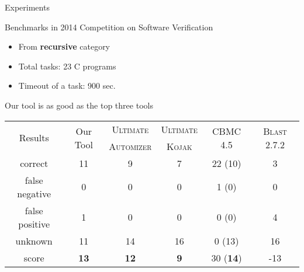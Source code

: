 \begin{frame}{Experiments}

  Benchmarks in 2014 Competition on Software Verification
  \begin{itemize}
    \item From \textbf{recursive} category
    \item Total tasks: 23 C programs
    \item Timeout of a task: 900 sec.
  \end{itemize}
  Our tool is as good as the top three tools

\begin{table}
\resizebox{\textwidth}{!}
{
\begin{tabular}{|c|cc|c|c|c|c|}
\hline
\multirow{2}{*}{Results} & \multicolumn{2}{c|}{\multirow{2}{*}{Our Tool}} & \textsc{Ultimate} & \textsc{Ultimate} & \multirow{2}{*}{CBMC 4.5} & \multirow{2}{*}{\textsc{Blast} 2.7.2} \\ 
& & & \textsc{Automizer} & \textsc{Kojak} & & \\
\hline\hline
correct          & \multicolumn{2}{c|}{11}   & 9    & 7  & 22 (10)   & 3 \\ 
false negative   & \multicolumn{2}{c|}{0}    & 0    & 0  & 1 (0)     & 0 \\
false positive   & \multicolumn{2}{c|}{1}    & 0    & 0  & 0 (0)     & 4 \\
unknown          & \multicolumn{2}{c|}{11}   & 14   & 16 & 0 (13)    & 16 \\
\hline\hline
score            & \multicolumn{2}{c|}{\textbf{13}}   & \textbf{12}   & \textbf{9}  & 30 (\textbf{14})   & -13 \\
\hline
\end{tabular}
}
\end{table}

\end{frame}